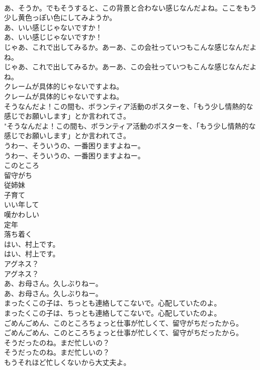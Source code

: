 \documentclass[8pt]{extreport}
\begin{document}
\begin{CJK}{UTF8}{min}
\\	あ、そうか。でもそうすると、この背景と合わない感じなんだよね。ここをもう少し黄色っぽい色にしてみようか。 
\\	あ、いい感じじゃないですか！	
\\	あ、いい感じじゃないですか！ 
\\	じゃあ、これで出してみるか。あーあ、この会社っていつもこんな感じなんだよね。	
\\	じゃあ、これで出してみるか。あーあ、この会社っていつもこんな感じなんだよね。 
\\	クレームが具体的じゃないですよね。	
\\	クレームが具体的じゃないですよね。 
\\	そうなんだよ！この間も、ボランティア活動のポスターを、「もう少し情熱的な感じでお願いします」とか言われてさ。	
\\	"そうなんだよ！この間も、ボランティア活動のポスターを、「もう少し情熱的な感じでお願いします」とか言われてさ。 
\\	うわー、そういうの、一番困りますよねー。	
\\	うわー、そういうの、一番困りますよねー。 
\\	このところ
\\	留守がち
\\	従姉妹
\\	子育て
\\	いい年して
\\	嘆かわしい
\\	定年
\\	落ち着く
\\	はい、村上です。	
\\	はい、村上です。 
\\	アグネス？	
\\	アグネス？ 
\\	あ、お母さん。久しぶりねー。	
\\	あ、お母さん。久しぶりねー。 
\\	まったくこの子は、ちっとも連絡してこないで。心配していたのよ。	
\\	まったくこの子は、ちっとも連絡してこないで。心配していたのよ。 
\\	ごめんごめん、このところちょっと仕事が忙しくて、留守がちだったから。	
\\	ごめんごめん、このところちょっと仕事が忙しくて、留守がちだったから。 
\\	そうだったのね。まだ忙しいの？	
\\	そうだったのね。まだ忙しいの？ 
\\	もうそれほど忙しくないから大丈夫よ。	

\end{CJK}
\end{document}
